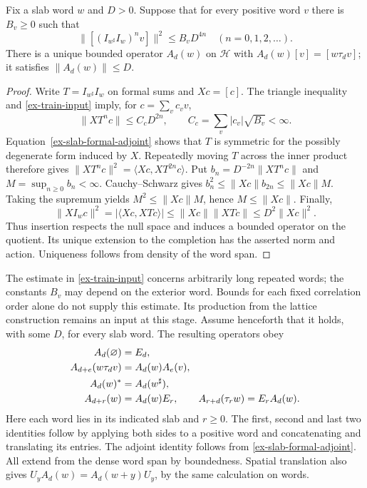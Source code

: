 \begin{lemma}
\label{ex-train-bound}
Fix a slab word \(w\) and \(D>0\). Suppose that for every positive word
\(v\) there is \(B_v\ge0\) such that
\begin{equation}\label{ex-train-input}
 \bigl\|[(I_{w^\sharp}I_w)^nv]\bigr\|^2\le B_vD^{4n}
 \quad(n=0,1,2,\ldots).
\end{equation}
There is a unique bounded operator \(A_d(w)\) on \(\mathcal H\) with
\(A_d(w)[v]=[w\tau_dv]\); it satisfies \(\|A_d(w)\|\le D\).
\end{lemma}
\begin{proof}
Write \(T=I_{w^\sharp}I_w\) on formal sums and \(Xc=[c]\).
The triangle inequality and \eqref{ex-train-input} imply, for
\(c=\sum_vc_vv\),
\[
 \|XT^nc\|\le C_cD^{2n},\qquad C_c=\sum_v|c_v|\sqrt{B_v}<\infty.
\]
Equation~\eqref{ex-slab-formal-adjoint} shows that \(T\) is symmetric
for the possibly degenerate form induced by \(X\). Repeatedly moving
\(T\) across the inner product therefore gives
\(\|XT^nc\|^2=\langle Xc,XT^{2n}c\rangle\).
Put \(b_n=D^{-2n}\|XT^nc\|\) and \(M=\sup_{n\ge0}b_n<\infty\).
Cauchy--Schwarz gives \(b_n^2\le\|Xc\|b_{2n}\le\|Xc\|M\).
Taking the supremum yields \(M^2\le\|Xc\|M\), hence \(M\le\|Xc\|\).
Finally,
\[
 \|XI_wc\|^2=|\langle Xc,XTc\rangle|
 \le\|Xc\|\|XTc\|\le D^2\|Xc\|^2.
\]
Thus insertion respects the null space and induces a bounded operator on
the quotient. Its unique extension to the completion has the asserted
norm and action. Uniqueness follows from density of the word span.
\end{proof}

The estimate in \eqref{ex-train-input} concerns arbitrarily long repeated
words; the constants \(B_v\) may depend on the exterior word. Bounds for
each fixed correlation order alone do not supply this estimate. Its
production from the lattice construction remains an input at this stage.
Assume henceforth that it holds, with some \(D\), for every slab word.
The resulting operators obey
\begin{align}
 A_d(\varnothing)&=E_d,\label{ex-slab-laws}\\
 A_{d+e}(w\tau_dv)&=A_d(w)A_e(v),\notag\\
 A_d(w)^*&=A_d(w^\sharp),\notag\\
 A_{d+r}(w)&=A_d(w)E_r,\qquad
 A_{r+d}(\tau_rw)=E_rA_d(w).\notag
\end{align}
Here each word lies in its indicated slab and \(r\ge0\).
The first, second and last two identities follow by applying both sides
to a positive word and concatenating and translating its entries.
The adjoint identity follows from \eqref{ex-slab-formal-adjoint}.
All extend from the dense word span by boundedness. Spatial translation
also gives
\(U_yA_d(w)=A_d(w+y)U_y\), by the same calculation on words.

